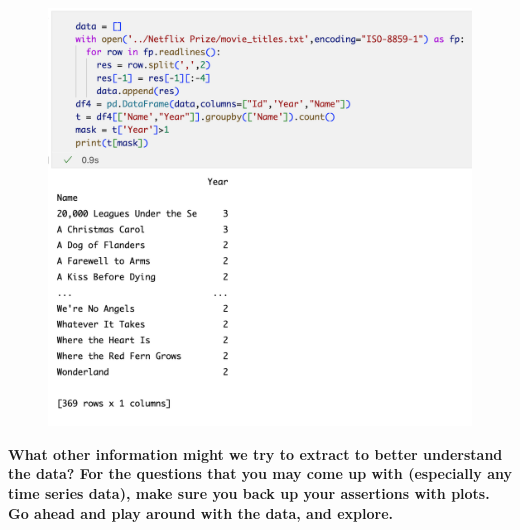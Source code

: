 \documentclass{article}
\begin{document}
\begin{enumerate}
\begin{figure}[H]
\includegraphics[width = 15cm]{images/5.png}
\end{figure}
{
\linespread{2.0} \selectfont
\item \textbf { What other information might we try to extract to better understand the data? For the questions that you may come up with (especially any time series data), make sure you back up your assertions with plots. Go ahead and play around with the data, and explore.}
}


\end{enumerate}
\end{document}
